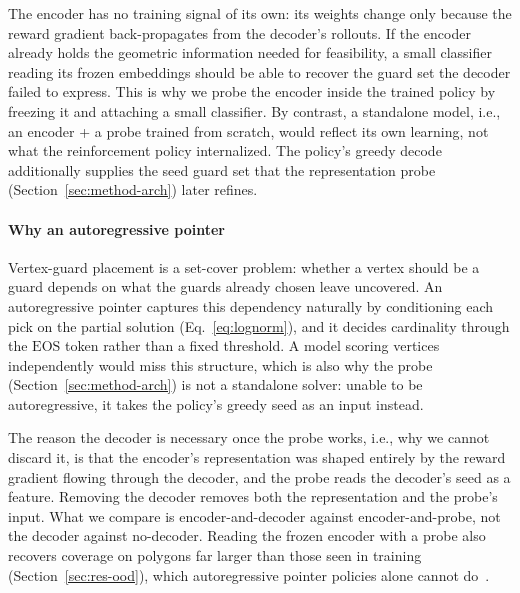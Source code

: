 \documentclass[11pt]{article}
\newcommand{\EOS}{\mathrm{EOS}}
\begin{document}
The encoder has no training signal of its own: its weights change only because the reward gradient back-propagates from the decoder's rollouts. If the encoder already holds the geometric information needed for feasibility, a small classifier reading its frozen embeddings should be able to recover the guard set the decoder failed to express. This is why we probe the encoder inside the trained policy by freezing it and attaching a small classifier. By contrast, a standalone model, i.e., an encoder + a probe trained from scratch, would reflect its own learning, not what the reinforcement policy internalized. The policy's greedy decode additionally supplies the seed guard set that the representation probe (Section~\ref{sec:method-arch}) later refines.

\paragraph{Why an autoregressive pointer} Vertex-guard placement is a set-cover problem: whether a vertex should be a guard depends on what the guards already chosen leave uncovered. An autoregressive pointer captures this dependency naturally by conditioning each pick on the partial solution (Eq.~\eqref{eq:lognorm}), and it decides cardinality through the $\EOS$ token rather than a fixed threshold. A model scoring vertices independently would miss this structure, which is also why the probe (Section~\ref{sec:method-arch}) is not a standalone solver: unable to be autoregressive, it takes the policy's greedy seed as an input instead.

The reason the decoder is necessary once the probe works, i.e., why we cannot discard it, is that the encoder's representation was shaped entirely by the reward gradient flowing through the decoder, and the probe reads the decoder's seed as a feature. Removing the decoder removes both the representation and the probe's input. What we compare is encoder-and-decoder against encoder-and-probe, not the decoder against no-decoder. Reading the frozen encoder with a probe also recovers coverage on polygons far larger than those seen in training (Section~\ref{sec:res-ood}), which autoregressive pointer policies alone cannot do~\cite{Vinyals2015,Jin2023Pointerformer}.
\end{document}
